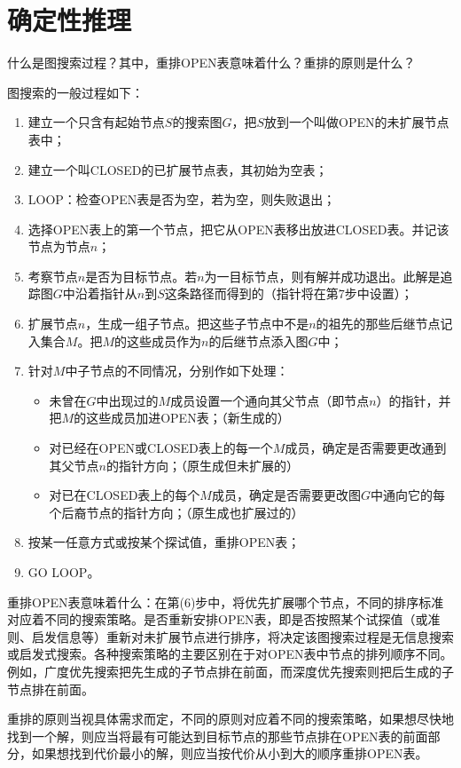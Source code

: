 \chapter{确定性推理}

\begin{question}
什么是图搜索过程？其中，重排OPEN表意味着什么？重排的原则是什么？
\end{question}	
\begin{solution}
图搜索的一般过程如下：
	\begin{enumerate}
		\item 建立一个只含有起始节点$S$的搜索图$G$，把$S$放到一个叫做OPEN的未扩展节点表中；
		\item 建立一个叫CLOSED的已扩展节点表，其初始为空表；
		\item LOOP：检查OPEN表是否为空，若为空，则失败退出；
		\item 选择OPEN表上的第一个节点，把它从OPEN表移出放进CLOSED表。并记该节点为节点$n$；
		\item 考察节点$n$是否为目标节点。若$n$为一目标节点，则有解并成功退出。此解是追踪图$G$中沿着指针从$n$到$S$这条路径而得到的（指针将在第7步中设置）；
		\item 扩展节点$n$，生成一组子节点。把这些子节点中不是$n$的祖先的那些后继节点记入集合$M$。把$M$的这些成员作为$n$的后继节点添入图$G$中；
		\item 针对$M$中子节点的不同情况，分别作如下处理：
			\begin{itemize}
				\item 未曾在$G$中出现过的$M$成员设置一个通向其父节点（即节点$n$）的指针，并把$M$的这些成员加进OPEN表；（新生成的）
				\item 对已经在OPEN或CLOSED表上的每一个$M$成员，确定是否需要更改通到其父节点$n$的指针方向；（原生成但未扩展的）
				\item 对已在CLOSED表上的每个$M$成员，确定是否需要更改图$G$中通向它的每个后裔节点的指针方向；（原生成也扩展过的）
			\end{itemize}
		\item 按某一任意方式或按某个探试值，重排OPEN表；
		\item GO LOOP。
	\end{enumerate} \par
重排OPEN表意味着什么：在第(6)步中，将优先扩展哪个节点，不同的排序标准对应着不同的搜索策略。是否重新安排OPEN表，即是否按照某个试探值（或准则、启发信息等）重新对未扩展节点进行排序，将决定该图搜索过程是无信息搜索或启发式搜索。各种搜索策略的主要区别在于对OPEN表中节点的排列顺序不同。例如，广度优先搜索把先生成的子节点排在前面，而深度优先搜索则把后生成的子节点排在前面。\par
重排的原则当视具体需求而定，不同的原则对应着不同的搜索策略，如果想尽快地找到一个解，则应当将最有可能达到目标节点的那些节点排在OPEN表的前面部分，如果想找到代价最小的解，则应当按代价从小到大的顺序重排OPEN表。
\end{solution}

